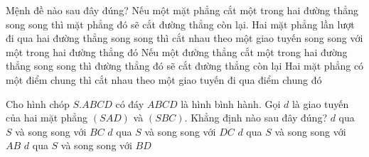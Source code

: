 \begin{ex}%
	Mệnh đề nào sau đây đúng?
	\choice
	{\True Nếu một mặt phẳng cắt một trong hai đường thẳng song song thì mặt phẳng đó sẽ cắt đường thẳng còn lại.}
	{Hai mặt phẳng lần lượt đi qua hai đường thẳng song song thì cắt nhau theo một giao tuyến song song với một trong hai đường thẳng đó}
	{Nếu một đường thẳng cắt một trong hai đường thẳng song song thì đường thẳng đó sẽ cắt đường thẳng còn lại}
	{ Hai mặt phẳng có một điểm chung thì cắt nhau theo một giao tuyến đi qua điểm chung đó}
	\loigiai{
		
	}
\end{ex}

\begin{ex}%
	Cho hình chóp $S.ABCD$ có đáy $ABCD$ là hình bình hành. Gọi $d$ là giao tuyến của hai mặt phẳng $(S A D)$ và $(S B C)$. Khẳng định nào sau đây đúng?
	\choice
	{\True $d$ qua $S$ và song song với $BC$}
	{$d$ qua $S$ và song song với $DC$}
	{$d$ qua $S$ và song song với $AB$}
	{$d$ qua $S$ và song song với $BD$}
\end{ex}


